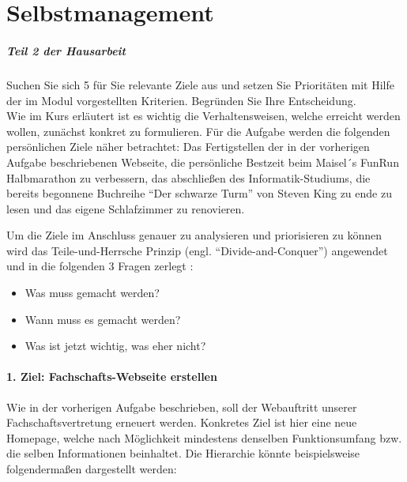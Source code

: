 %
\chapter{Selbstmanagement}
\label{sec:selbstmanagement}

\paragraph{Teil 2 der Hausarbeit}
Suchen Sie sich 5 für Sie relevante Ziele aus und setzen Sie Prioritäten mit Hilfe der im Modul vorgestellten Kriterien. Begründen Sie Ihre Entscheidung. \\[4em]

Wie im Kurs erläutert ist es wichtig die Verhaltensweisen, welche erreicht werden wollen, zunächst konkret zu formulieren. Für die Aufgabe werden die folgenden persönlichen Ziele näher betrachtet: Das Fertigstellen der in der vorherigen Aufgabe beschriebenen Webseite, die persönliche Bestzeit beim Maisel´s FunRun Halbmarathon zu verbessern, das abschließen des Informatik-Studiums, die bereits begonnene Buchreihe “Der schwarze Turm” von Steven King zu ende zu lesen und das eigene Schlafzimmer zu renovieren.

Um die Ziele im Anschluss genauer zu analysieren und priorisieren zu können wird das Teile-und-Herrsche Prinzip (engl. “Divide-and-Conquer”) angewendet und in die folgenden 3 Fragen zerlegt \cite{WEB:VHB:LuSt1:Zielhierarchien}:

\begin{itemize}
    \item Was muss gemacht werden?
    \item Wann muss es gemacht werden?
    \item Was ist jetzt wichtig, was eher nicht?
\end{itemize}

\subsubsection{1. Ziel: Fachschafts-Webseite erstellen}
Wie in der vorherigen Aufgabe beschrieben, soll der Webauftritt unserer Fachschaftsvertretung erneuert werden. Konkretes Ziel ist hier eine neue Homepage, welche nach Möglichkeit mindestens denselben Funktionsumfang bzw. die selben Informationen beinhaltet.
Die Hierarchie könnte beispielsweise folgendermaßen dargestellt werden:

